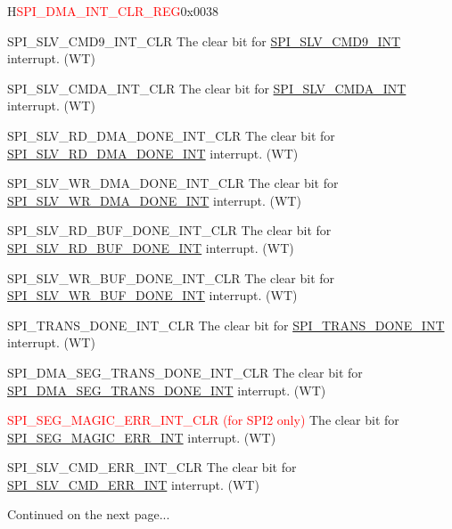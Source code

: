\begin{register}{H}{\textcolor{red}{SPI\_DMA\_INT\_CLR\_REG}}{0x{}0038}
\begin{regdesc}
\begin{reglist}
\label{fielddesc:SPISLVCMD9INTCLR}\item [SPI\_SLV\_CMD9\_INT\_CLR] The clear bit for \hyperref[int:SPISLVCMD9INT]{SPI\_SLV\_CMD9\_INT} interrupt. (WT)
\label{fielddesc:SPISLVCMDAINTCLR}\item [SPI\_SLV\_CMDA\_INT\_CLR] The clear bit for \hyperref[int:SPISLVCMDAINT]{SPI\_SLV\_CMDA\_INT} interrupt. (WT)
\label{fielddesc:SPISLVRDDMADONEINTCLR}\item [SPI\_SLV\_RD\_DMA\_DONE\_INT\_CLR] The clear bit for \hyperref[int:SPISLVRDDMADONEINT]{SPI\_SLV\_RD\_DMA\_DONE\_INT} interrupt. (WT)
\label{fielddesc:SPISLVWRDMADONEINTCLR}\item [SPI\_SLV\_WR\_DMA\_DONE\_INT\_CLR] The clear bit for \hyperref[int:SPISLVWRDMADONEINT]{SPI\_SLV\_WR\_DMA\_DONE\_INT} interrupt. (WT)
\label{fielddesc:SPISLVRDBUFDONEINTCLR}\item [SPI\_SLV\_RD\_BUF\_DONE\_INT\_CLR] The clear bit for \hyperref[int:SPISLVRDBUFDONEINT]{SPI\_SLV\_RD\_BUF\_DONE\_INT} interrupt. (WT)
\label{fielddesc:SPISLVWRBUFDONEINTCLR}\item [SPI\_SLV\_WR\_BUF\_DONE\_INT\_CLR] The clear bit for \hyperref[int:SPISLVWRBUFDONEINT]{SPI\_SLV\_WR\_BUF\_DONE\_INT} interrupt. (WT)
\label{fielddesc:SPITRANSDONEINTCLR}\item [SPI\_TRANS\_DONE\_INT\_CLR] The clear bit for \hyperref[int:SPITRANSDONEINT]{SPI\_TRANS\_DONE\_INT} interrupt. (WT)
\label{fielddesc:SPIDMASEGTRANSDONEINTCLR}\item [SPI\_DMA\_SEG\_TRANS\_DONE\_INT\_CLR] The clear bit for \hyperref[int:SPIDMASEGTRANSDONEINT]{SPI\_DMA\_SEG\_TRANS\_DONE\_INT} interrupt. (WT)
\label{fielddesc:SPISEGMAGICERRINTCLR}\item [\textcolor{red}{SPI\_SEG\_MAGIC\_ERR\_INT\_CLR (for SPI2 only)}] The clear bit for \hyperref[int:SPISEGMAGICERRINT]{SPI\_SEG\_MAGIC\_ERR\_INT} interrupt. (WT)
\label{fielddesc:SPISLVCMDERRINTCLR}\item [SPI\_SLV\_CMD\_ERR\_INT\_CLR] The clear bit for \hyperref[int:SPISLVCMDERRINT]{SPI\_SLV\_CMD\_ERR\_INT} interrupt. (WT)

\item [Continued on the next page...]
\end{reglist}\end{regdesc}
\end{register}

